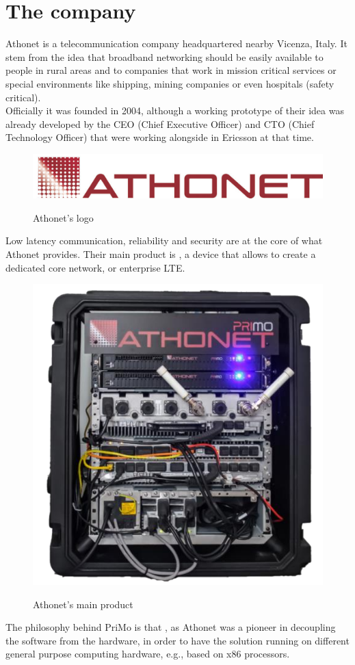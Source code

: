 \section{The company}
	Athonet\cite{athonet} is a telecommunication company headquartered nearby Vicenza, Italy.
	It stem from the idea that \gls{broadband networking} should be easily available to people in rural areas and to companies that work in mission critical services or special environments like shipping, mining companies or even hospitals (safety critical).\\
	Officially it was founded in 2004, although a working prototype of their idea was already developed by the CEO (Chief Executive Officer) and CTO (Chief Technology Officer) that were working alongside in Ericsson\cite{ericsson} at that time.
	\begin{figure}[H]
		\centering
		\includegraphics[width=.7\textwidth]{resources/ath_logo}\\
		\caption[Athonet's logo]{Athonet's logo}
	\end{figure}
	\gls{Low latency} communication, reliability and security are at the core of what Athonet provides.
	Their main product is , a device that allows to create a dedicated \gls{core network}, or enterprise \gls{LTE}.
	\begin{figure}[H]
		\centering
		\includegraphics[width=.5\textwidth]{resources/gianluca_primo}\\
		\caption[]{Athonet's main product \textbf{}\cite{gianluca_primo}}
	\end{figure}
	The philosophy behind PriMo is that , as Athonet was a pioneer in decoupling the software from the hardware, in order to have the solution running on different general purpose computing hardware, e.g., based on x86 processors.\\
